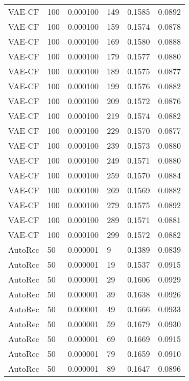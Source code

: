 \begin{tabular}{llrlrr}
  VAE-CF &  100 &  0.000100 &   149 &  0.1585 &       0.0892 \\
  VAE-CF &  100 &  0.000100 &   159 &  0.1574 &       0.0878 \\
  VAE-CF &  100 &  0.000100 &   169 &  0.1580 &       0.0888 \\
  VAE-CF &  100 &  0.000100 &   179 &  0.1577 &       0.0880 \\
  VAE-CF &  100 &  0.000100 &   189 &  0.1575 &       0.0877 \\
  VAE-CF &  100 &  0.000100 &   199 &  0.1576 &       0.0882 \\
  VAE-CF &  100 &  0.000100 &   209 &  0.1572 &       0.0876 \\
  VAE-CF &  100 &  0.000100 &   219 &  0.1574 &       0.0882 \\
  VAE-CF &  100 &  0.000100 &   229 &  0.1570 &       0.0877 \\
  VAE-CF &  100 &  0.000100 &   239 &  0.1573 &       0.0880 \\
  VAE-CF &  100 &  0.000100 &   249 &  0.1571 &       0.0880 \\
  VAE-CF &  100 &  0.000100 &   259 &  0.1570 &       0.0884 \\
  VAE-CF &  100 &  0.000100 &   269 &  0.1569 &       0.0882 \\
  VAE-CF &  100 &  0.000100 &   279 &  0.1575 &       0.0892 \\
  VAE-CF &  100 &  0.000100 &   289 &  0.1571 &       0.0881 \\
  VAE-CF &  100 &  0.000100 &   299 &  0.1572 &       0.0882 \\
 AutoRec &   50 &  0.000001 &     9 &  0.1389 &       0.0839 \\
 AutoRec &   50 &  0.000001 &    19 &  0.1537 &       0.0915 \\
 AutoRec &   50 &  0.000001 &    29 &  0.1606 &       0.0929 \\
 AutoRec &   50 &  0.000001 &    39 &  0.1638 &       0.0926 \\
 AutoRec &   50 &  0.000001 &    49 &  0.1666 &       0.0933 \\
 AutoRec &   50 &  0.000001 &    59 &  0.1679 &       0.0930 \\
 AutoRec &   50 &  0.000001 &    69 &  0.1669 &       0.0915 \\
 AutoRec &   50 &  0.000001 &    79 &  0.1659 &       0.0910 \\
 AutoRec &   50 &  0.000001 &    89 &  0.1647 &       0.0896 \\

\end{tabular}
